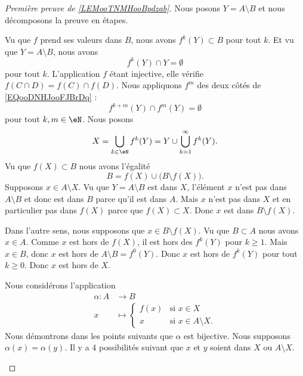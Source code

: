 \begin{proof}[Première preuve de \ref{LEMooTNMHooBpdzab}]
	Nous posons \( Y=A\setminus B\) et nous décomposons la preuve en étapes.
	\begin{subproof}
		Vu que \( f\) prend ses valeurs dans \( B\), nous avons \( f^k(Y)\subset B\) pour tout \( k\). Et vu que \( Y=A\setminus B\), nous avons
		\begin{equation}        \label{EQooDNHJooFJBrDq}
			f^k(Y)\cap Y=\emptyset
		\end{equation}
		pour tout \( k\). L'application \( f\) étant injective, elle vérifie \( f(C\cap D)=f(C)\cap f(D)\). Nous appliquons \( f^m\) des deux côtés de \eqref{EQooDNHJooFJBrDq} :
		\begin{equation}
			f^{k+m}(Y)\cap f^m(Y)=\emptyset
		\end{equation}
		pour tout \( k,m\in \eN\).
		Nous posons
		\begin{equation}
			X=\bigcup_{k\in \eN}f^k(Y)=Y\cup\bigcup_{k=1}^{\infty}f^k(Y).
		\end{equation}
		Vu que \( f(X)\subset B\) nous avons l'égalité
		\begin{equation}
			B=f(X)\cup\big(B\setminus f(X)\big).
		\end{equation}
		\spitem[\( A\setminus X=B\setminus f(X)\)]
		Supposons \( x\in A\setminus X\). Vu que \( Y=A\setminus B\) est dans \( X\), l'élément \( x\) n'est pas dans \( A\setminus B\) et donc est dans \( B\) parce qu'il est dans \( A\). Mais \( x\) n'est pas dans \( X\) et en particulier pas dans \( f(X)\) parce que \( f(X)\subset X\). Donc \( x\) est dans \( B\setminus f(X)\).

		Dans l'autre sens, nous supposons que \( x\in B\setminus f(X)\). Vu que \( B\subset A\) nous avons \( x\in A\). Comme \( x\) est hors de \( f(X)\), il est hors des \( f^k(Y)\) pour \( k\geq 1\). Mais \( x\in B\), donc \( x\) est hors de \( A\setminus B=f^0(Y)\). Donc \( x\) est hors de \( f^k(Y)\) pour tout \( k\geq 0\). Donc \( x\) est hors de \( X\).

		\spitem[La bijection]
		Nous considérons l'application
		\begin{equation}
			\begin{aligned}
				\alpha\colon A & \to B                                        \\
				x              & \mapsto \begin{cases}
					                         f(x) & \text{si } x\in X             \\
					                         x    & \text{si } x\in A\setminus X.
				                         \end{cases}
			\end{aligned}
		\end{equation}
		Nous démontrons dans les points suivants que \( \alpha\) est bijective.
		\spitem[Injective]
		Nous supposons \( \alpha(x)=\alpha(y)\). Il y a 4 possibilités suivant que \( x\) et \( y\) soient dans \( X\) ou \( A\setminus X\).


\end{subproof}
\end{proof}
